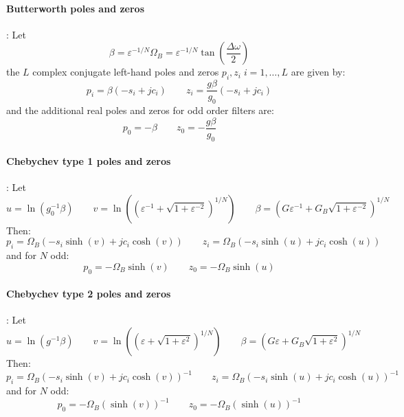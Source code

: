 \paragraph{Butterworth poles and zeros}:
Let
\begin{equation}
 \beta = \varepsilon^{-1/N} \Omega_B =  \varepsilon^{-1/N} \tan \left( \frac{\Delta \omega}{2} \right)
\end{equation}
the $L$ complex conjugate left-hand poles and zeros $p_i, z_i \; i = 1,\ldots,L$ are given by:
\begin{equation}
 p_i = \beta (-s_i + j c_i) \qquad z_i = \frac{g \beta}{g_0} (-s_i + j c_i) 
\end{equation}
and the additional real poles and zeros for odd order filters are:
\begin{equation}
 p_0 = - \beta  \qquad z_0 = -\frac{g \beta}{g_0} \qquad
\end{equation}

\paragraph{Chebychev type 1 poles and zeros}:
Let
\begin{equation}
 u = \ln(g_0^{-1} \beta) \qquad v = \ln( (\varepsilon^{-1} + \sqrt{1 + \varepsilon^{-2}})^{1/N} ) \qquad
 \beta = (G \varepsilon^{-1} + G_B \sqrt{1 + \varepsilon^{-2}})^{1/N}
\end{equation}
Then:
\begin{equation}
 p_i = \Omega_B (-s_i \sinh(v) + j c_i \cosh(v)) \qquad z_i = \Omega_B (-s_i \sinh(u) + j c_i \cosh(u))
\end{equation}
and for $N$ odd:
\begin{equation}
 p_0 = -\Omega_B \sinh(v) \qquad z_0 = -\Omega_B \sinh(u)
\end{equation}

\paragraph{Chebychev type 2 poles and zeros}:
Let
\begin{equation}
 u = \ln(g^{-1} \beta) \qquad v = \ln( (\varepsilon + \sqrt{1 + \varepsilon^2 })^{1/N} ) \qquad
 \beta = (G \varepsilon + G_B \sqrt{1 + \varepsilon^2 })^{1/N}
\end{equation}
Then:
\begin{equation}
 p_i = \Omega_B (-s_i \sinh(v) + j c_i \cosh(v))^{-1} \qquad z_i = \Omega_B (-s_i \sinh(u) + j c_i \cosh(u))^{-1}
\end{equation}
and for $N$ odd:
\begin{equation}
 p_0 = -\Omega_B (\sinh(v))^{-1} \qquad z_0 = -\Omega_B (\sinh(u))^{-1}
\end{equation}

